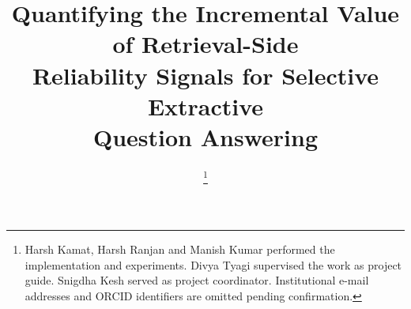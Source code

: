 \documentclass[conference]{IEEEtran}
\begin{document}
\title{Quantifying the Incremental Value of Retrieval-Side\\ Reliability Signals for Selective Extractive\\ Question Answering}

\author{%
%
\thanks{Harsh Kamat, Harsh Ranjan and Manish Kumar performed the implementation and
experiments. Divya Tyagi supervised the work as project guide. Snigdha Kesh served as
project coordinator. Institutional e-mail addresses and ORCID identifiers are omitted
pending confirmation.}%
}

\maketitle
\end{document}
